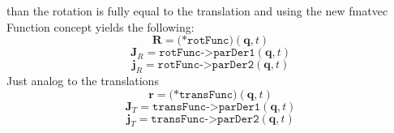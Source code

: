 \documentclass{report}
\newcommand{\bs}[1]{\boldsymbol #1}
\begin{document}
than the rotation is fully equal to the translation and using the new fmatvec Function concept yields the following:
\begin{equation}
\bs{R}=\texttt{(*rotFunc)}(\bs{q},t)
\end{equation}
\begin{equation}
\bs{J}_R=\texttt{rotFunc->parDer1}(\bs{q},t)
\end{equation}
\begin{equation}
\bs{j}_R=\texttt{rotFunc->parDer2}(\bs{q},t)
\end{equation}
Just analog to the translations
\begin{equation}
\bs{r}=\texttt{(*transFunc)}(\bs{q},t)
\end{equation}
\begin{equation}
\bs{J}_T=\texttt{transFunc->parDer1}(\bs{q},t)
\end{equation}
\begin{equation}
\bs{j}_T=\texttt{transFunc->parDer2}(\bs{q},t)
\end{equation}
\end{document}
